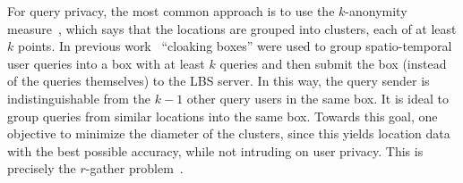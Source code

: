 For query privacy, the most common approach is to use the $k$-anonymity measure~\cite{Sweeney02}, which says that the locations are grouped into clusters, each of at least $k$ points. 
In previous work~\cite{Gruteser:2003:AUL:1066116.1189037,Mokbel:2006:NCQ:1182635.1164193} ``cloaking boxes'' were used to group spatio-temporal user queries into a box with at least $k$ queries and then submit the box (instead of the queries themselves) to the LBS server. In this way, the query sender is indistinguishable from the $k-1$ other query users in the same box. It is ideal to group queries from similar locations into the same box.
Towards this goal, one objective to minimize the diameter of the clusters, since this yields location data with the best possible accuracy, while not intruding on user privacy.  This is precisely the $r$-gather problem~\cite{Aggarwal06achievinganonymity}.





